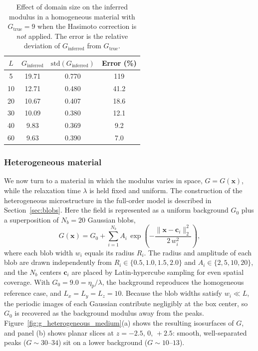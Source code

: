 \documentclass{elsarticle}
\renewcommand{\vec}[1]{\boldsymbol{#1}}
\newcommand{\stdof}[1]{\mathrm{std}(#1)}
\begin{document}
\begin{table}[!ht]
\centering
\begin{tabular}{cccc}
\toprule
$L$ & $G_{\mathrm{inferred}}$ & $\stdof{G_{\mathrm{inferred}}}$ & Error (\%) \\
\midrule
5  & 19.71 & 0.770 & 119 \\
10 & 12.71 & 0.480 & 41.2 \\
20 & 10.67 & 0.407 & 18.6 \\
30 & 10.09 & 0.380 & 12.1 \\
40 & 9.83  & 0.369 & 9.2 \\
60 & 9.63  & 0.390 & 7.0 \\
\bottomrule
\end{tabular}
\caption{Effect of domain size on the inferred modulus in a homogeneous
material with $G_{\mathrm{true}} = 9$ when the Hasimoto correction is
\emph{not} applied. The error is the relative deviation of
$G_{\mathrm{inferred}}$ from $G_{\mathrm{true}}$.}
\label{tab:hasimoto_homogeneous}
\end{table}

\FloatBarrier

\subsubsection{Heterogeneous material}
\label{sec:heterogeneous_inference}

We now turn to a material in which the modulus varies in space,
$G = G(\vec{x})$, while the relaxation time $\lambda$ is held fixed and
uniform. The construction of the heterogeneous microstructure in the
full-order model is described in Section~\ref{sec:blobs}. Here the field is
represented as a uniform background $G_0$ plus a superposition of
$N_b = 20$ Gaussian blobs,
\begin{equation}
G(\vec{x}) = G_0 + \sum_{i=1}^{N_b} A_i \,
\exp\!\left(-\frac{\lVert \vec{x} - \vec{c}_i \rVert_2^2}
{2\,w_i^2}\right),
\label{eq:G_field}
\end{equation}
where each blob width $w_i$ equals its radius $R_i$. The radius and
amplitude of each blob are drawn independently from
$R_i \in \{0.5, 1.0, 1.5, 2.0\}$ and $A_i \in \{2, 5, 10, 20\}$, and the
$N_b$ centers $\vec{c}_i$ are placed by Latin-hypercube sampling for even
spatial coverage. With $G_0 = 9.0 = \eta_{\mathrm{p}}/\lambda$, the
background reproduces the homogeneous reference case, and
$L_x = L_y = L_z = 10$. Because the blob widths satisfy $w_i \ll L$, the
periodic images of each Gaussian contribute negligibly at the box center,
so $G_0$ is recovered as the background modulus away from the peaks.
Figure~\ref{fig:g_heterogeneous_medium}(a) shows the resulting
isosurfaces of $G$, and panel (b) shows planar slices at
$z = -2.5,\, 0,\, +2.5$: smooth, well-separated peaks
($G \sim 30\text{--}34$) sit on a lower background
($G \sim 10\text{--}13$).
\end{document}
